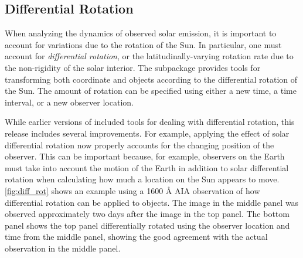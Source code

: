 \subsection{Differential Rotation}
\label{sec:differential_rotation}



When analyzing the dynamics of observed solar emission, it is important to account for variations due to the rotation of the Sun.
In particular, one must account for \textit{differential rotation}, or the latitudinally-varying rotation rate due to the non-rigidity of the solar interior.
The  subpackage provides tools for transforming both  coordinate and  objects according to the differential rotation of the Sun.
The amount of rotation can be specified using either a new time, a time interval, or a new observer location.

While earlier versions of \sunpypkg included tools for dealing with differential rotation, this release includes several improvements.
For example, applying the effect of solar differential rotation now properly accounts for the changing position of the observer.
This can be important because, for example, observers on the Earth must take into account the motion of the Earth in addition to solar differential rotation when calculating how much a location on the Sun appears to move.
\autoref{fig:diff_rot} shows an example using a 1600 \AA{} AIA observation of how differential rotation can be applied to  objects.
The image in the middle panel was observed approximately two days after the image in the top panel.
The bottom panel shows the top panel differentially rotated using the observer location and time from the middle panel, showing the good agreement with the actual observation in the middle panel.

